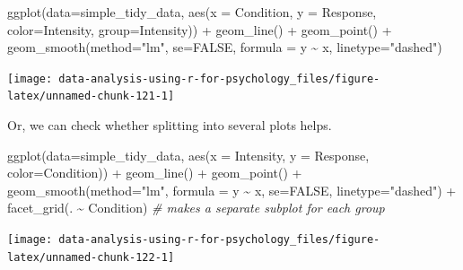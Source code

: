 \documentclass[
]{book}
\newenvironment{Shaded}{\begin{snugshade}}{\end{snugshade}}
\newcommand{\AttributeTok}[1]{\textcolor[rgb]{0.77,0.63,0.00}{#1}}
\newcommand{\CommentTok}[1]{\textcolor[rgb]{0.56,0.35,0.01}{\textit{#1}}}
\newcommand{\ConstantTok}[1]{\textcolor[rgb]{0.00,0.00,0.00}{#1}}
\newcommand{\FunctionTok}[1]{\textcolor[rgb]{0.00,0.00,0.00}{#1}}
\newcommand{\NormalTok}[1]{#1}
\newcommand{\SpecialCharTok}[1]{\textcolor[rgb]{0.00,0.00,0.00}{#1}}
\newcommand{\StringTok}[1]{\textcolor[rgb]{0.31,0.60,0.02}{#1}}
\begin{document}
\begin{Shaded}
\begin{Highlighting}[]
\FunctionTok{ggplot}\NormalTok{(}\AttributeTok{data=}\NormalTok{simple\_tidy\_data, }\FunctionTok{aes}\NormalTok{(}\AttributeTok{x =}\NormalTok{ Condition, }\AttributeTok{y =}\NormalTok{ Response, }\AttributeTok{color=}\NormalTok{Intensity, }\AttributeTok{group=}\NormalTok{Intensity)) }\SpecialCharTok{+} 
  \FunctionTok{geom\_line}\NormalTok{() }\SpecialCharTok{+}
  \FunctionTok{geom\_point}\NormalTok{() }\SpecialCharTok{+}
  \FunctionTok{geom\_smooth}\NormalTok{(}\AttributeTok{method=}\StringTok{"lm"}\NormalTok{, }\AttributeTok{se=}\ConstantTok{FALSE}\NormalTok{,  }\AttributeTok{formula =}\NormalTok{ y }\SpecialCharTok{\textasciitilde{}}\NormalTok{ x, }\AttributeTok{linetype=}\StringTok{"dashed"}\NormalTok{)}
\end{Highlighting}
\end{Shaded}

\begin{center}\texttt{[image: data-analysis-using-r-for-psychology\_files/figure-latex/unnamed-chunk-121-1]} \end{center}

Or, we can check whether splitting into several plots helps.

\begin{Shaded}
\begin{Highlighting}[]
\FunctionTok{ggplot}\NormalTok{(}\AttributeTok{data=}\NormalTok{simple\_tidy\_data, }\FunctionTok{aes}\NormalTok{(}\AttributeTok{x =}\NormalTok{ Intensity, }\AttributeTok{y =}\NormalTok{ Response, }\AttributeTok{color=}\NormalTok{Condition)) }\SpecialCharTok{+} 
  \FunctionTok{geom\_line}\NormalTok{() }\SpecialCharTok{+}
  \FunctionTok{geom\_point}\NormalTok{() }\SpecialCharTok{+}
  \FunctionTok{geom\_smooth}\NormalTok{(}\AttributeTok{method=}\StringTok{"lm"}\NormalTok{, }\AttributeTok{formula =}\NormalTok{ y }\SpecialCharTok{\textasciitilde{}}\NormalTok{ x, }\AttributeTok{se=}\ConstantTok{FALSE}\NormalTok{, }\AttributeTok{linetype=}\StringTok{"dashed"}\NormalTok{) }\SpecialCharTok{+}
  \FunctionTok{facet\_grid}\NormalTok{(. }\SpecialCharTok{\textasciitilde{}}\NormalTok{ Condition) }\CommentTok{\# makes a separate subplot for each group}
\end{Highlighting}
\end{Shaded}

\begin{center}\texttt{[image: data-analysis-using-r-for-psychology\_files/figure-latex/unnamed-chunk-122-1]} \end{center}
\end{document}
